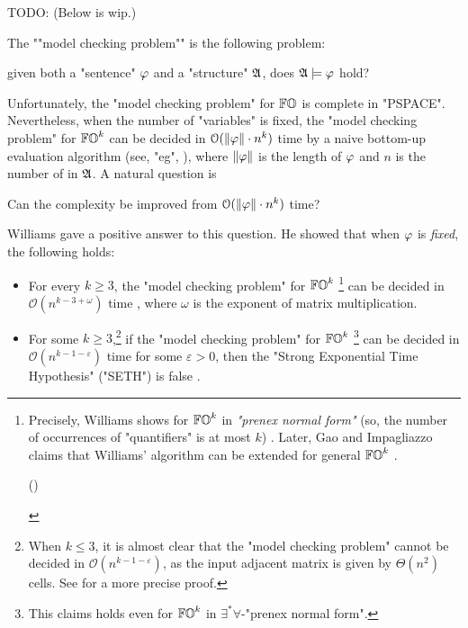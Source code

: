\begin{yoshiki}
    TODO: (Below is wip.)
\end{yoshiki}

\AP The ""model checking problem"" is the following problem:
\begin{center}
given both a "sentence" $\fml$ and a "structure" $\struc$, does $\struc \models \fml$ hold?
\end{center}
Unfortunately, the "model checking problem" for $\mathbb{FO}$ is complete in "PSPACE".
Nevertheless, when the number of "variables" is fixed, the "model checking problem" for $\mathbb{FO}^{k}$ can be decided in $\mathcal{O}(\len{\fml} \cdot n^{k})$ time by a naive bottom-up evaluation algorithm (see, "eg", \cite[Proposition 3.1]{vardiComplexityBoundedvariableQueries1995}),
where $\len{\fml}$ is the length of $\fml$ and $n$ is the number of  in $\struc$.
A natural question is 
\begin{center}
    Can the complexity be improved from $\mathcal{O}(\len{\fml} \cdot n^{k})$ time?
\end{center}

Williams \cite{williamsFasterDecisionFirstorder2014} gave a positive answer to this question.
He showed that when $\fml$ is \emph{fixed}, the following holds:
\begin{itemize}
    \item
    For every $k \ge 3$, the "model checking problem" for $\mathbb{FO}^{k}$ %
    \footnote{Precisely, Williams \cite{williamsFasterDecisionFirstorder2014} shows for $\mathbb{FO}^{k}$  in \emph{"prenex normal form"} (so, the number of occurrences of "quantifiers" is at most $k$) \cite[Corollary 1.3]{williamsFasterDecisionFirstorder2014}.
    Later, Gao and Impagliazzo \cite[Theorem 7]{gaoFineGrainedComplexityStrengthenings2019} claims that Williams' algorithm can be extended for general $\mathbb{FO}^{k}$ .
    \begin{yoshiki}
    ()
    \end{yoshiki}
    } can be decided in $\mathcal{O}(n^{k - 3 + \omega})$ time \cite[Corollary 1.3]{williamsFasterDecisionFirstorder2014}\cite[Theorem 7]{gaoFineGrainedComplexityStrengthenings2019},
    where $\omega$ is the exponent of matrix multiplication.
    
    \item For some $k \ge 3$,\footnote{When $k \le 3$, it is almost clear that the "model checking problem" cannot be decided in $\mathcal{O}(n^{k-1-\varepsilon})$, as the input adjacent matrix is given by $\Theta(n^2)$ cells. See  for a more precise proof.}
    if the "model checking problem" for $\mathbb{FO}^{k}$ \footnote{This claims holds even for $\mathbb{FO}^{k}$  in $\exists^{*} \forall$-"prenex normal form".} can be decided in $\mathcal{O}(n^{k-1-\varepsilon})$ time for some $\varepsilon > 0$,
    then the "Strong Exponential Time Hypothesis" ("SETH") is false \cite[Corollary 1.4]{williamsFasterDecisionFirstorder2014}.
\end{itemize}

